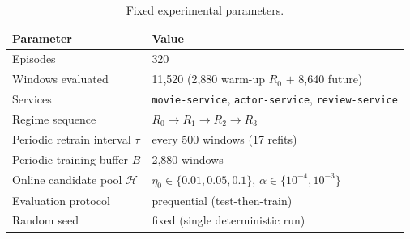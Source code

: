 \documentclass[acmsmall]{acmart}
\begin{document}
\begin{table}[h]
\caption{Fixed experimental parameters.}\label{tab:appconst}
\begin{tabular}{@{}ll@{}}
\toprule
Parameter & Value \\
\midrule
Episodes                       & 320 \\
Windows evaluated              & 11{,}520 (2{,}880 warm-up $R_0$ ${+}$ 8{,}640 future) \\
Services                       & \texttt{movie-service}, \texttt{actor-service}, \texttt{review-service} \\
Regime sequence                & $R_0 \rightarrow R_1 \rightarrow R_2 \rightarrow R_3$ \\
Periodic retrain interval $\tau$ & every 500 windows (17 refits) \\
Periodic training buffer $B$   & 2{,}880 windows \\
Online candidate pool $\mathcal{H}$ & $\eta_0 \in \{0.01,0.05,0.1\}$, $\alpha \in \{10^{-4},10^{-3}\}$ \\
Evaluation protocol            & prequential (test-then-train) \\
Random seed                    & fixed (single deterministic run) \\
\bottomrule
\end{tabular}
\end{table}
\end{document}
